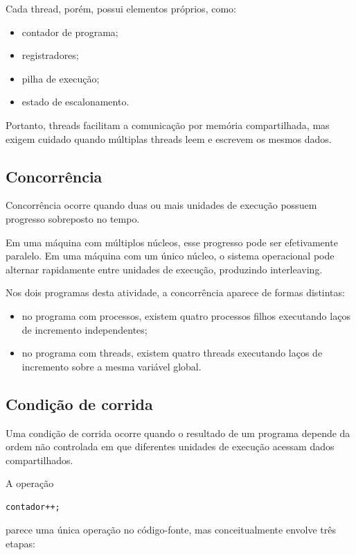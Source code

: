 Cada thread, porém, possui elementos próprios, como:

\begin{itemize}
    \item contador de programa;
    \item registradores;
    \item pilha de execução;
    \item estado de escalonamento.
\end{itemize}

Portanto, threads facilitam a comunicação por memória compartilhada, mas exigem cuidado quando múltiplas threads leem e escrevem os mesmos dados.

\subsection{Concorrência}

Concorrência ocorre quando duas ou mais unidades de execução possuem progresso sobreposto no tempo.

Em uma máquina com múltiplos núcleos, esse progresso pode ser efetivamente paralelo. Em uma máquina com um único núcleo, o sistema operacional pode alternar rapidamente entre unidades de execução, produzindo interleaving.

Nos dois programas desta atividade, a concorrência aparece de formas distintas:

\begin{itemize}
    \item no programa com processos, existem quatro processos filhos executando laços de incremento independentes;
    \item no programa com threads, existem quatro threads executando laços de incremento sobre a mesma variável global.
\end{itemize}

\subsection{Condição de corrida}

Uma condição de corrida ocorre quando o resultado de um programa depende da ordem não controlada em que diferentes unidades de execução acessam dados compartilhados.

A operação

\begin{verbatim}
contador++;
\end{verbatim}

parece uma única operação no código-fonte, mas conceitualmente envolve três etapas:

